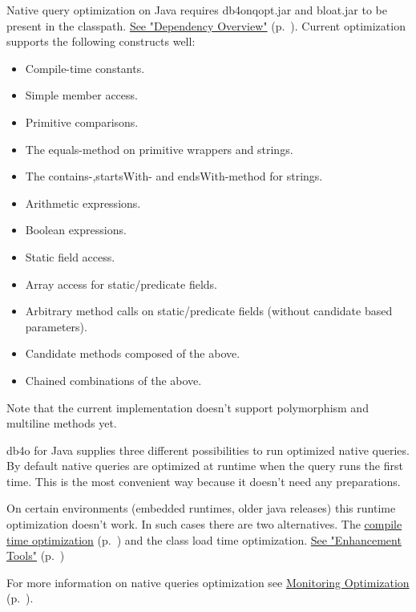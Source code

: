 Native query optimization on Java requires db4onqopt.jar and bloat.jar to be present in the classpath. \hyperref[ref:dependency-overview]{See "Dependency Overview"} (p.~\pageref{ref:dependency-overview}). Current optimization supports the following constructs well:

\begin{itemize}
\item Compile-time constants.
\item Simple member access.
\item Primitive comparisons.
\item The equals-method on primitive wrappers and strings.
\item The contains-,startsWith- and endsWith-method for strings.
\item Arithmetic expressions.
\item Boolean expressions.
\item Static field access.
\item Array access for static/predicate fields.
\item Arbitrary method calls on static/predicate fields (without candidate based parameters).
\item Candidate methods composed of the above.
\item Chained combinations of the above.
\end{itemize}

Note that the current implementation doesn't support polymorphism and multiline methods yet.

db4o for Java supplies three different possibilities to run optimized native queries. By default native queries are optimized at runtime when the query runs the first time. This is the most convenient way because it doesn't need any preparations.

On certain environments (embedded runtimes, older java releases) this runtime optimization doesn't work. In such cases there are two alternatives. The \hyperref[ref:basics-querying-native-queries-native-query-optimization-nq-build-time-optimisation]{compile time optimization} (p.~\pageref{ref:basics-querying-native-queries-native-query-optimization-nq-build-time-optimisation}) and the class load time optimization. \hyperref[ref:advanced-topics-enhancement-tools]{See "Enhancement Tools"} (p.~\pageref{ref:advanced-topics-enhancement-tools})

For more information on native queries optimization see \hyperref[ref:basics-querying-native-queries-native-query-optimization-monitoring-optimization]{Monitoring Optimization} (p.~\pageref{ref:basics-querying-native-queries-native-query-optimization-monitoring-optimization}).


